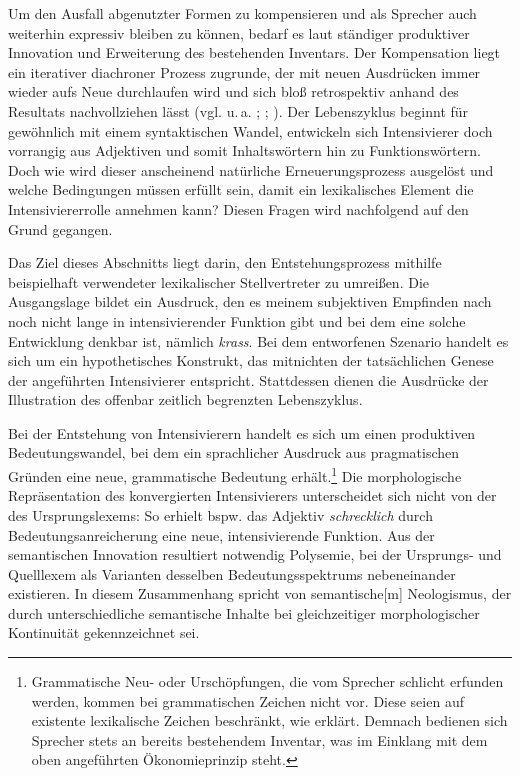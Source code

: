 Um den Ausfall abgenutzter Formen zu kompensieren und als Sprecher auch weiterhin expressiv bleiben zu können, bedarf es laut {\citet[274]{Baumgarten.1908}} ständiger produktiver Innovation und Erweiterung des bestehenden Inventars. Der Kompensation liegt ein iterativer diachroner Prozess zugrunde, der mit neuen Ausdrücken immer wieder aufs Neue durchlaufen wird und sich bloß retrospektiv anhand des Resultats nachvollziehen lässt (vgl. u.\,a. \citealt[120]{Lipka.1981}; {\citealt[85]{Skommer.1992}}; {\citealt[71]{Blank.2001}}). Der Lebenszyklus beginnt für gewöhnlich mit einem syntaktischen Wandel, entwickeln sich Intensivierer doch vorrangig aus Adjektiven und somit Inhaltswörtern hin zu Funktionswörtern. Doch wie wird dieser anscheinend natürliche Erneuerungsprozess ausgelöst und welche Bedingungen müssen erfüllt sein, damit ein lexikalisches Element die Intensiviererrolle annehmen kann? Diesen Fragen wird nachfolgend auf den {Grund gegangen}.

Das Ziel dieses Abschnitts liegt darin, den Entstehungsprozess mithilfe beispielhaft verwendeter lexikalischer Stellvertreter zu umreißen. Die Ausgangslage bildet ein Ausdruck, den es meinem subjektiven Empfinden nach noch nicht lange in intensivierender Funktion gibt und bei dem eine solche Entwicklung denkbar ist, nämlich \textit{krass}. Bei dem entworfenen Szenario handelt es sich um ein hypothetisches Konstrukt, das mitnichten der tatsächlichen Genese der angeführten Intensivierer entspricht. Stattdessen dienen die Ausdrücke der Illustration des offenbar zeitlich {begrenzten Lebenszyklus}.


Bei der Entstehung von Intensivierern handelt es sich um einen produktiven Bedeutungswandel, bei dem ein sprachlicher Ausdruck aus pragmatischen Gründen eine neue, grammatische Bedeutung erhält.\footnote{Grammatische Neu- oder Urschöpfungen, die vom Sprecher schlicht erfunden werden, kommen bei grammatischen Zeichen nicht vor. Diese seien auf existente lexikalische Zeichen beschränkt, wie {\citet[1254]{Lehmann.1995}} erklärt. Demnach bedienen sich Sprecher stets an bereits bestehendem Inventar, was im Einklang mit dem oben angeführten {Ökonomieprinzip steht}.} Die morphologische Repräsentation des konvergierten Intensivierers unterscheidet sich nicht von der des Ursprungslexems: So erhielt bspw. das Adjektiv \textit{schrecklich} durch Bedeutungsanreicherung eine neue, intensivierende Funktion. Aus der semantischen Innovation resultiert notwendig Polysemie, bei der Ursprungs- und Quelllexem als Varianten desselben Bedeutungsspektrums nebeneinander existieren. In diesem Zusammenhang spricht \citet[27]{Gevaudan.2007} von \glqq{}semantische[m] Neologismus\grqq{}, der durch unterschiedliche semantische Inhalte bei gleichzeitiger morphologischer Kontinuität gekennzeichnet sei.

